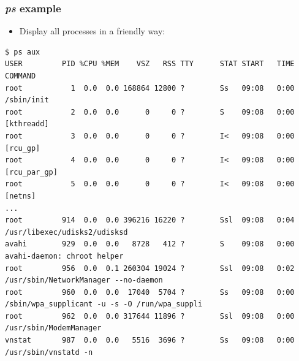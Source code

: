 \begin{frame}[fragile]
  \frametitle{{\em ps} example}
  \begin{itemize}
  \frametitle{Processes with {\em ps}}
    \item Display all processes in a friendly way:
  \end{itemize}
  \begin{block}{}
    \begin{verbatim}
$ ps aux
USER         PID %CPU %MEM    VSZ   RSS TTY      STAT START   TIME COMMAND
root           1  0.0  0.0 168864 12800 ?        Ss   09:08   0:00 /sbin/init
root           2  0.0  0.0      0     0 ?        S    09:08   0:00 [kthreadd]
root           3  0.0  0.0      0     0 ?        I<   09:08   0:00 [rcu_gp]
root           4  0.0  0.0      0     0 ?        I<   09:08   0:00 [rcu_par_gp]
root           5  0.0  0.0      0     0 ?        I<   09:08   0:00 [netns]
...
root         914  0.0  0.0 396216 16220 ?        Ssl  09:08   0:04 /usr/libexec/udisks2/udisksd
avahi        929  0.0  0.0   8728   412 ?        S    09:08   0:00 avahi-daemon: chroot helper
root         956  0.0  0.1 260304 19024 ?        Ssl  09:08   0:02 /usr/sbin/NetworkManager --no-daemon
root         960  0.0  0.0  17040  5704 ?        Ss   09:08   0:00 /sbin/wpa_supplicant -u -s -O /run/wpa_suppli
root         962  0.0  0.0 317644 11896 ?        Ssl  09:08   0:00 /usr/sbin/ModemManager
vnstat       987  0.0  0.0   5516  3696 ?        Ss   09:08   0:00 /usr/sbin/vnstatd -n
    \end{verbatim}
  \end{block}
\end{frame}

